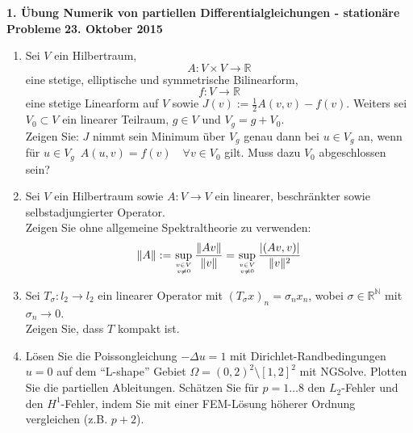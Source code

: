 \documentclass[11pt,a4paper]{report}
\begin{document}
\begin{center}
\textbf{1. \"Ubung Numerik von partiellen Differentialgleichungen - station\"are Probleme} \newline 
\textbf{23. Oktober 2015}
\end{center}
\begin{enumerate}



\item Sei $V$ ein Hilbertraum, 
$$A: V \times V \rightarrow \mathbb{R} $$
eine stetige, elliptische und symmetrische Bilinearform, 
$$ f: V \rightarrow \mathbb{R}$$ eine stetige Linearform auf $V$ sowie $J(v):= \frac{1}{2}A(v,v)-f(v) $. Weiters sei $V_0 \subset V$ ein linearer Teilraum, $g \in V$ und $V_g = g + V_0$. 
\\
Zeigen Sie: $J$ nimmt sein Minimum \"uber $V_g$ genau dann bei $u \in V_g$ an, wenn f\"ur $u\in V_g\,$ $A(u,v)=f(v) \quad \forall v\in V_0$ gilt. Muss dazu $V_0$ abgeschlossen sein?
\vspace{15pt}



\item Sei $V$ ein Hilbertraum sowie $A: V \rightarrow V$ ein linearer, beschr\"ankter sowie selbstadjungierter Operator. \\ Zeigen Sie ohne allgemeine Spektraltheorie zu verwenden:\\
$$ \| A\| := \sup\limits_{v \in V \atop v\neq 0} \frac{\|Av \|}{\| v \|} = \sup\limits_{v\in V\atop v\neq 0} \frac{|(Av,v)|}{\|v\|^2}$$
\vspace{15pt}



\item Sei $T_\sigma:l_2 \rightarrow l_2$ ein linearer Operator mit $(T_\sigma x)_n = \sigma_n x_n$, wobei $\sigma\in \mathbb{R}^{\mathbb{N}}$ mit $\sigma_n\rightarrow 0$.
\\ Zeigen Sie, dass $T$ kompakt ist.
\vspace{15pt}


\item L\"osen Sie die Poissongleichung $-\Delta u = 1$ mit
  Dirichlet-Randbedingungen $u=0$ auf dem ``L-shape'' Gebiet $\Omega =
  (0,2)^2 \setminus [1,2]^2$ mit NGSolve. Plotten Sie die partiellen
  Ableitungen. Sch\"atzen Sie f\"ur $p=1 \ldots 8$ den $L_2$-Fehler und den
  $H^1$-Fehler, indem Sie mit einer FEM-L\"osung h\"oherer Ordnung
  vergleichen (z.B. $p+2$). 

\end{enumerate}
\end{document}
